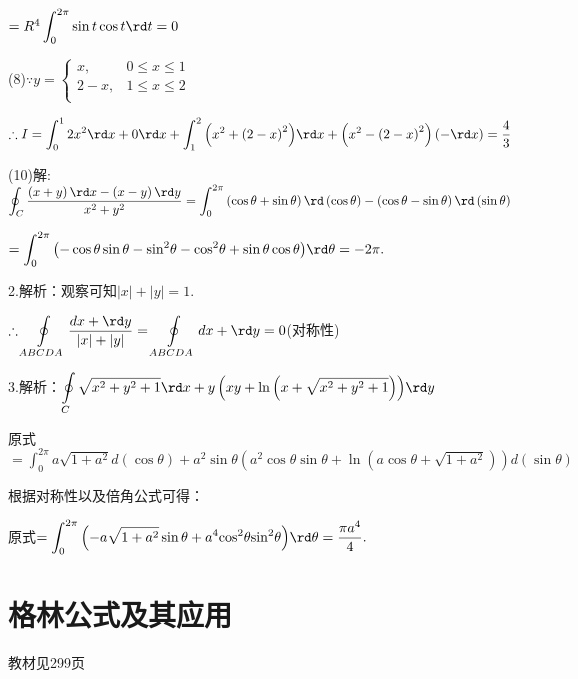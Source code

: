   $= {R^4}\displaystyle\int_0^{2\pi } {\sin t\cos t\rd t = 0} $

  (8)$\because y = \begin{cases}
    x, & 0 \le x \le 1 \\
  	2 - x, & 1 \le x \le 2 \\
  	\end{cases}$

  $\therefore I = \displaystyle\int_0^1 {2{x^2}\rd x + 0\rd x + \displaystyle\int_1^2 {\left( {{x^2} + {{\left( {2 - x} \right)}^2}} \right)} } \rd x + \left( {{x^2} - {{\left( {2 - x} \right)}^2}} \right)\left( { - \rd x} \right) = \dfrac{4}{3}$

  (10)解: $\displaystyle\oint_C {\dfrac{{\left( {x + y} \right)\rd x - \left( {x - y} \right)\rd y}}{{{x^2} + {y^2}}}}  = \displaystyle\int_0^{2\pi } {\left( {\cos \theta  + \sin \theta } \right)\rd \left( {\cos \theta } \right) - \left( {\cos \theta  - \sin \theta } \right)\rd \left( {\sin \theta } \right)} $

  $= \displaystyle\int_0^{2\pi } {\left( { - \cos \theta \sin \theta  - {{\sin }^2}\theta  - {{\cos }^2}\theta  + \sin \theta \cos \theta } \right)} \rd \theta  =  - 2\pi .$

  2.解析：观察可知$\left| x \right| + \left| y \right| = 1.$

  $\therefore \displaystyle\oint\limits_{ABCDA} {\dfrac{{dx +  \rd y }}{{\left| x \right| + \left| y \right|}} = \displaystyle\oint\limits_{ABCDA} {dx +  \rd y  = 0} } $(对称性)

  3.解析：$\displaystyle\oint\limits_C {\sqrt {{x^2} + {y^2} + 1} \rd x + y\left( {xy + \ln \left( {x + \sqrt {{x^2} + {y^2} + 1} } \right)} \right)} \rd y$

  原式$= \displaystyle\int_0^{2\pi } {a\sqrt {1 + {a^2}} d} \left( {\cos \theta } \right) + {a^2}\sin \theta \left( {{a^2}\cos \theta \sin \theta  + \ln \left( {a\cos \theta  + \sqrt {1 + {a^2}} } \right)} \right)d\left( {\sin \theta } \right)$

  根据对称性以及倍角公式可得：

  原式$= \displaystyle\int_0^{2\pi } {\left( { - a\sqrt {1 + {a^2}} \sin \theta  + {a^4}{{\cos }^2}\theta {{\sin }^2}\theta } \right)} \rd \theta  = \dfrac{{\pi {a^4}}}{4}.$

\section{格林公式及其应用}
\begin{flushright}
  \color{zhanqing!80}
   教材见299页
\end{flushright}

